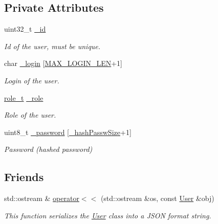 \subsection*{Private Attributes}
\begin{DoxyCompactItemize}
\item 
\hypertarget{classUser_a81d04840c2371421635ff226986a4e1d}{}uint32\+\_\+t \hyperlink{classUser_a81d04840c2371421635ff226986a4e1d}{\+\_\+id}\label{classUser_a81d04840c2371421635ff226986a4e1d}

\begin{DoxyCompactList}\small\item\em Id of the user, must be unique. \end{DoxyCompactList}\item 
char \hyperlink{classUser_a10ad4e44dff0d98d90f65a75dae1a903}{\+\_\+login} \mbox{[}\hyperlink{user_8hpp_a43842dcd60d621d7d9c9b9e4ecd76f78}{M\+A\+X\+\_\+\+L\+O\+G\+I\+N\+\_\+\+L\+E\+N}+1\mbox{]}
\begin{DoxyCompactList}\small\item\em Login of the user. \end{DoxyCompactList}\item 
\hypertarget{classUser_a40b529a76a0b275d2adcb42d609f3256}{}\hyperlink{user_8hpp_a147824aa4797bb7a9bcf276b5de0cb7c}{role\+\_\+t} \hyperlink{classUser_a40b529a76a0b275d2adcb42d609f3256}{\+\_\+role}\label{classUser_a40b529a76a0b275d2adcb42d609f3256}

\begin{DoxyCompactList}\small\item\em Role of the user. \end{DoxyCompactList}\item 
\hypertarget{classUser_a4d3b4e36483c47846d9b157ffd9f7ccc}{}uint8\+\_\+t \hyperlink{classUser_a4d3b4e36483c47846d9b157ffd9f7ccc}{\+\_\+password} \mbox{[}\hyperlink{classUser_a2869314c4d5d41923d74150bea362140}{\+\_\+hash\+Passw\+Size}+1\mbox{]}\label{classUser_a4d3b4e36483c47846d9b157ffd9f7ccc}

\begin{DoxyCompactList}\small\item\em Password (hashed password) \end{DoxyCompactList}\end{DoxyCompactItemize}
\subsection*{Friends}
\begin{DoxyCompactItemize}
\item 
std\+::ostream \& \hyperlink{classUser_adf65de944b3cede5af5bbd0916e6f32f}{operator$<$$<$} (std\+::ostream \&os, const \hyperlink{classUser}{User} \&obj)
\begin{DoxyCompactList}\small\item\em This function serializes the \hyperlink{classUser}{User} class into a J\+S\+O\+N format string. \end{DoxyCompactList}\end{DoxyCompactItemize}


